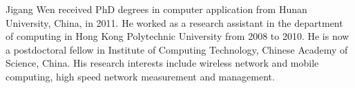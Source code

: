 \begin{IEEEbiography}{Jigang Wen}
received PhD degrees in computer application from Hunan University, China, in 2011. He worked as a research assistant in the department of computing in Hong Kong Polytechnic University from 2008 to 2010. He is now a postdoctoral fellow
in Institute of Computing Technology, Chinese Academy of Science, China. His research interests include wireless network and mobile computing, high speed network measurement and management.
\end{IEEEbiography}